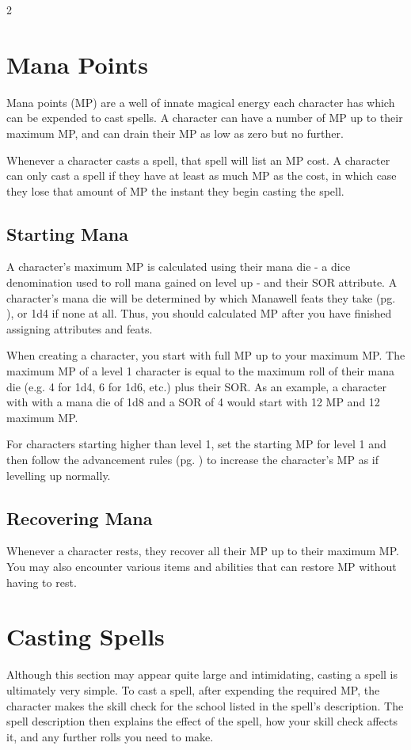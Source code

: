 \begin{multicols*}{2}
    \section{Mana Points}\label{mana points}\label{maximum mana points}
    Mana points (MP) are a well of innate magical energy each character
    has which can be expended to cast spells. A character can have
    a number of MP up to their maximum MP, and can drain their MP as
    low as zero but no further.

    Whenever a character casts a spell, that spell will list an MP
    cost. A character can only cast a spell if they have at least as
    much MP as the cost, in which case they lose that amount of MP
    the instant they begin casting the spell.

    \subsection{Starting Mana}
    A character's maximum MP is calculated using their mana die - a
    dice denomination used to roll mana gained on level up - and their
    SOR attribute. A character's mana die will be determined by which
    Manawell feats they take (pg. \pageref{feat:manawell}), or 1d4 if
    none at all. Thus, you should calculated MP after you have
    finished assigning attributes and feats.

    When creating a character, you start with full MP up to your
    maximum MP. The maximum MP of a level 1 character is equal to the
    maximum roll of their mana die (e.g. 4 for 1d4, 6 for 1d6, etc.)
    plus their SOR. As an example, a character with with a mana die
    of 1d8 and a SOR of 4 would start with 12 MP and 12 maximum MP.

    For characters starting higher than level 1, set the starting MP
    for level 1 and then follow the advancement rules (pg.
    \pageref{advancement}) to increase the character's MP as if
    levelling up normally.

    \subsection{Recovering Mana}
    Whenever a character rests, they recover all their MP up to their
    maximum MP. You may also encounter various items and abilities
    that can restore MP without having to rest.

    \section{Casting Spells}
    Although this section may appear quite large and intimidating,
    casting a spell is ultimately very simple. To cast a spell, after
    expending the required MP, the character makes the skill check for
    the school listed in the spell's description. The spell description
    then explains the effect of the spell, how your skill check
    affects it, and any further rolls you need to make.


\end{multicols*}
